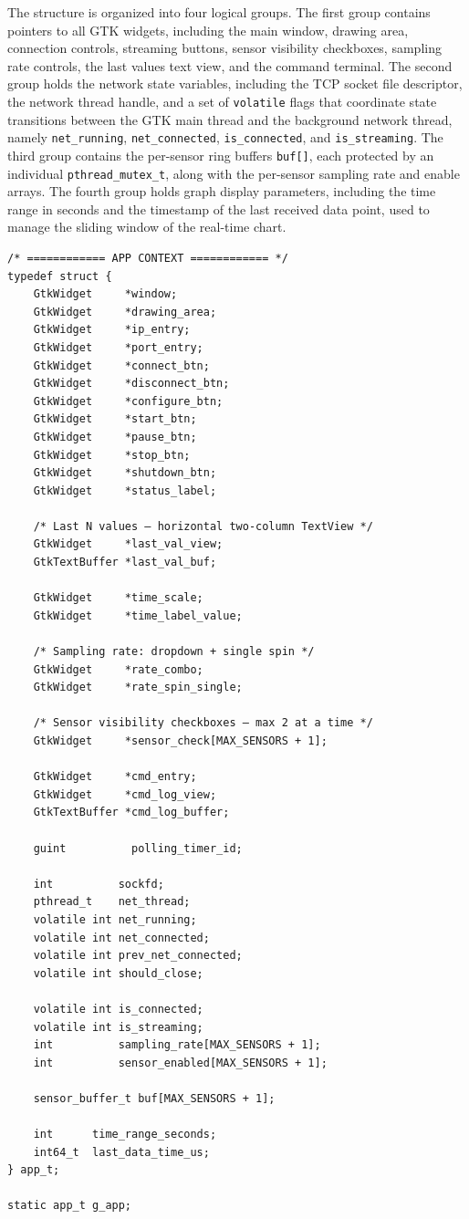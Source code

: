 The structure is organized into four logical groups. The first group
contains pointers to all GTK widgets, including the main window, drawing
area, connection controls, streaming buttons, sensor visibility
checkboxes, sampling rate controls, the last values text view, and the
command terminal. The second group holds the network state variables,
including the TCP socket file descriptor, the network thread handle, and
a set of \texttt{volatile} flags that coordinate state transitions between
the GTK main thread and the background network thread, namely
\texttt{net\_running}, \texttt{net\_connected}, \texttt{is\_connected},
and \texttt{is\_streaming}. The third group contains the per-sensor
ring buffers \texttt{buf[]}, each protected by an individual
\texttt{pthread\_mutex\_t}, along with the per-sensor sampling rate and
enable arrays. The fourth group holds graph display parameters, including
the time range in seconds and the timestamp of the last received data
point, used to manage the sliding window of the real-time chart.
\begin{verbatim}
/* ============ APP CONTEXT ============ */
typedef struct {
    GtkWidget     *window;
    GtkWidget     *drawing_area;
    GtkWidget     *ip_entry;
    GtkWidget     *port_entry;
    GtkWidget     *connect_btn;
    GtkWidget     *disconnect_btn;
    GtkWidget     *configure_btn;
    GtkWidget     *start_btn;
    GtkWidget     *pause_btn;
    GtkWidget     *stop_btn;
    GtkWidget     *shutdown_btn;
    GtkWidget     *status_label;

    /* Last N values — horizontal two-column TextView */
    GtkWidget     *last_val_view;
    GtkTextBuffer *last_val_buf;

    GtkWidget     *time_scale;
    GtkWidget     *time_label_value;

    /* Sampling rate: dropdown + single spin */
    GtkWidget     *rate_combo;
    GtkWidget     *rate_spin_single;

    /* Sensor visibility checkboxes — max 2 at a time */
    GtkWidget     *sensor_check[MAX_SENSORS + 1];

    GtkWidget     *cmd_entry;
    GtkWidget     *cmd_log_view;
    GtkTextBuffer *cmd_log_buffer;

    guint          polling_timer_id;

    int          sockfd;
    pthread_t    net_thread;
    volatile int net_running;
    volatile int net_connected;
    volatile int prev_net_connected;
    volatile int should_close;

    volatile int is_connected;
    volatile int is_streaming;
    int          sampling_rate[MAX_SENSORS + 1];
    int          sensor_enabled[MAX_SENSORS + 1];

    sensor_buffer_t buf[MAX_SENSORS + 1];

    int      time_range_seconds;
    int64_t  last_data_time_us;
} app_t;

static app_t g_app;
\end{verbatim}

